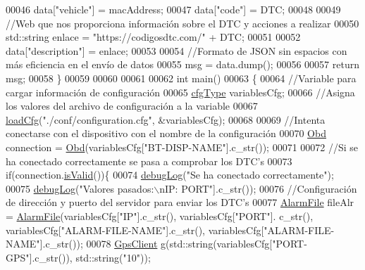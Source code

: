 \begin{DoxyCode}
00046     data[\textcolor{stringliteral}{"vehicle"}] = macAddress;
00047     data[\textcolor{stringliteral}{"code"}] = DTC;
00048 
00049     \textcolor{comment}{//Web que nos proporciona información sobre el DTC y acciones a realizar}
00050     std::string enlace = \textcolor{stringliteral}{"https://codigosdtc.com/"} + DTC;
00051 
00052     data[\textcolor{stringliteral}{"description"}] = enlace;
00053 
00054     \textcolor{comment}{//Formato de JSON sin espacios con más eficiencia en el envío de datos}
00055     msg = data.dump();
00056 
00057     \textcolor{keywordflow}{return} msg;
00058 \}
00059 
00060 
00061 
00062 \textcolor{keywordtype}{int} main()
00063 \{
00064     \textcolor{comment}{//Variable para cargar información de configuración}
00065     \hyperlink{loadcfg_8hpp_a3bc0e674227412446fc364a733cebde6}{cfgType} variablesCfg;
00066     \textcolor{comment}{//Asigna los valores del archivo de configuración a la variable}
00067     \hyperlink{loadcfg_8cpp_a4667fdb45ba6b04ab678f894e58a2fcb}{loadCfg}(\textcolor{stringliteral}{"./conf/configuration.cfg"}, &variablesCfg);
00068 
00069     \textcolor{comment}{//Intenta conectarse con el dispositivo con el nombre de la configuración}
00070     \hyperlink{classObd}{Obd} connection = \hyperlink{classObd}{Obd}(variablesCfg[\textcolor{stringliteral}{"BT-DISP-NAME"}].c\_str());
00071 
00072     \textcolor{comment}{//Si se ha conectado correctamente se pasa a comprobar los DTC's}
00073     \textcolor{keywordflow}{if}(connection.\hyperlink{classObd_ae28b765bb787467f929eae932133d2aa}{isValid}())\{
00074         \hyperlink{debug_8hpp_a55f41cf7b0585224496de3d7adbc101c}{debugLog}(\textcolor{stringliteral}{"Se ha conectado correctamente"});
00075         \hyperlink{debug_8hpp_a55f41cf7b0585224496de3d7adbc101c}{debugLog}(\textcolor{stringliteral}{"Valores pasados:\(\backslash\)nIP: %
      PORT"}].c\_str());
00076         \textcolor{comment}{//Configuración de dirección y puerto del servidor para enviar los DTC's}
00077         \hyperlink{classAlarmFile}{AlarmFile} fileAlr = \hyperlink{classAlarmFile}{AlarmFile}(variablesCfg[\textcolor{stringliteral}{"IP"}].c\_str(), variablesCfg[\textcolor{stringliteral}{"PORT"}].
      c\_str(), variablesCfg[\textcolor{stringliteral}{"ALARM-FILE-NAME"}].c\_str(), variablesCfg[\textcolor{stringliteral}{"ALARM-FILE-NAME"}].c\_str());
00078         \hyperlink{classGpsClient}{GpsClient} g(std::string(variablesCfg[\textcolor{stringliteral}{"PORT-GPS"}].c\_str()), std::string(\textcolor{stringliteral}{"10"}));

\end{DoxyCode}
